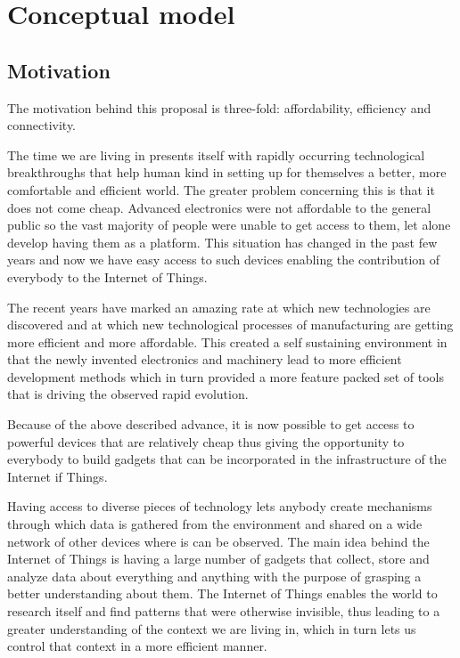 \chapter{Conceptual model}
\label{chap:concept}

\section{Motivation}

\qquad The motivation behind this proposal is three-fold: affordability, efficiency and connectivity.

\qquad The time we are living in presents itself with rapidly occurring technological breakthroughs that help human
kind in setting up for themselves a better, more comfortable and efficient world. The greater problem concerning
this is that it does not come cheap. Advanced electronics were not affordable to the general public so the vast
majority of people were unable to get access to them, let alone develop  having them as a platform. This
situation has changed in the past few years and now we have easy access to such devices enabling the
contribution of everybody to the Internet of Things.

\qquad The recent years have marked an amazing rate at which new technologies are discovered and at which new
technological processes of manufacturing are getting more efficient and more affordable. This created a self
sustaining environment in that the newly invented electronics and machinery lead to more efficient
development methods which in turn provided a more feature packed set of tools that is driving the observed
rapid evolution.

Because of the above described advance, it is now possible to get access to powerful devices that are
relatively cheap thus giving the opportunity to everybody to build gadgets that can be incorporated
in the infrastructure of the Internet if Things.

\qquad Having access to diverse pieces of technology lets anybody create mechanisms through which data is gathered
from the environment and shared on a wide network of other devices where is can be observed.
The main idea behind the Internet of Things is having a large number of gadgets that collect, store and
analyze data about everything and anything with the purpose of grasping a better understanding about them.
The Internet of Things enables the world to research itself and find patterns that were otherwise invisible,
thus leading to a greater understanding of the context we are living in, which in turn lets us control that
context in a more efficient manner.


